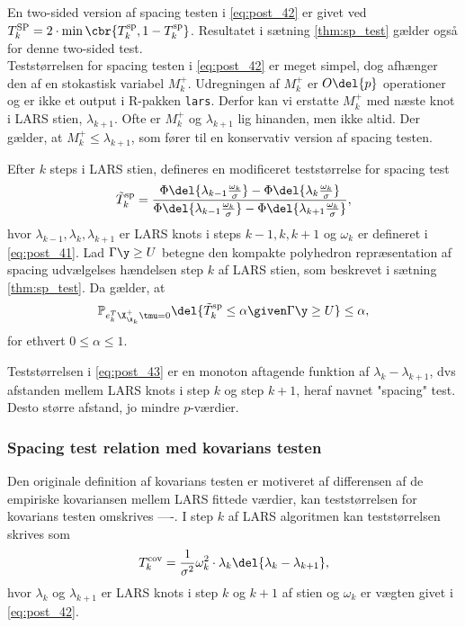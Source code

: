 En two-sided version af spacing testen i \eqref{eq:post_42} er givet ved \(T_k^\text{SP} = 2 \cdot \min \cbr{T_k^\text{sp}, 1 - T_k^\text{sp}}\).
Resultatet i sætning \ref{thm:sp_test} gælder også for denne two-sided test. \\[3mm]
%
Teststørrelsen for spacing testen i \eqref{eq:post_42} er meget simpel, dog afhænger den af en stokastisk variabel \(M_k^+\).
Udregningen af \(M_k^+\) er \(O\del{p}\) operationer og er ikke et output i R-pakken \texttt{lars}.
Derfor kan vi erstatte \(M_k^+\) med næste knot i LARS stien, \(\lambda_{k+1}\).
Ofte er \(M_k^+\) og \(\lambda_{k+1}\) lig hinanden, men ikke altid.
Der gælder, at \(M_k^+ \leq \lambda_{k+1}\), som fører til en konservativ version af spacing testen.
%
\begin{thm}
Efter \(k\) steps i LARS stien, defineres en modificeret teststørrelse for spacing test
\begin{align}
\tilde{T}_k^\text{sp}= \frac{\Phi \del{\lambda_{k-1} \frac{\omega_k}{\sigma}} - \Phi \del{\lambda_{k} \frac{\omega_k}{\sigma}}}{\Phi \del{\lambda_{k-1} \frac{\omega_k}{\sigma}} - \Phi \del{\lambda_{k+1} \frac{\omega_k}{\sigma}}}, \label{eq:post_43}
\end{align}
hvor \(\lambda_{k-1}, \lambda_k, \lambda_{k+1}\) er LARS knots i steps \(k-1, k, k+1\) og \(\omega_k\) er defineret i \eqref{eq:post_41}.
Lad \(\Gamma \y \geq U\) betegne den kompakte polyhedron repræsentation af spacing udvælgelses hændelsen step \(k\) af LARS stien, som beskrevet i sætning \ref{thm:sp_test}.
Da gælder, at
\begin{align*}
\mathbb{P}_{e_k^T \X_{\A_k}^+ \tmu = 0} \del{\tilde{T}_k^\text{sp} \leq \alpha \given \Gamma \y \geq U} \leq \alpha,
\end{align*}
for ethvert \(0 \leq \alpha \leq 1\).
\end{thm}
%
Teststørrelsen i \eqref{eq:post_43} er en monoton aftagende funktion af \(\lambda_k - \lambda_{k+1}\), dvs afstanden mellem LARS knots i step \(k\) og step \(k+1\), heraf navnet "spacing" test.
Desto større afstand, jo mindre \(p\)-værdier.

\subsubsection{Spacing test relation med kovarians testen}

Den originale definition af kovarians testen er motiveret af differensen af de empiriske kovariansen mellem LARS fittede værdier, kan teststørrelsen for kovarians testen omskrives ----.
I step \(k\) af LARS algoritmen kan teststørrelsen skrives som
\begin{align}
T_k^\text{cov} = \frac{1}{\sigma^2} \omega_k^2 \cdot \lambda_k \del{\lambda_k - \lambda_{k+1}}, \label{eq:post_44}
\end{align}
hvor \(\lambda_k\) og \(\lambda_{k+1}\) er LARS knots i step \(k\) og \(k+1\) af stien og \(\omega_k\) er vægten givet i \eqref{eq:post_42}.


